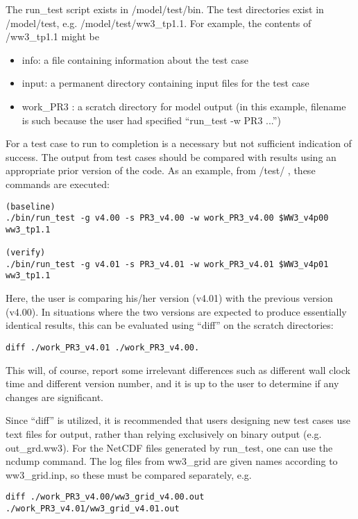 \documentclass[12pt]{article}
\newcommand{\file}{\sf}
\begin{document}
The {\file run\_test} script exists in {\file /model/test/bin}. The test
directories exist in {\file /model/test}, e.g.  {\file/model/test/ww3\_tp1.1}. For
example, the contents of {\file /ww3\_tp1.1} might be
  \begin{itemize}
\item {\file info}: a file containing information
about the test case 
\item {\file input}: a permanent directory containing input files for
the test case 
\item {\file work\_PR3} : a scratch directory for model output (in this
example, filename is such because the user had specified ``{\file run\_test -w PR3
...''})
  \end{itemize}

For a test case to run to completion is a necessary but not sufficient
indication of success. The output from test cases should be compared with
results using an appropriate prior version of the code. As an example, from
{\file/test/} , these commands are executed:
\begin{center}
{\small \begin{verbatim}
(baseline)
./bin/run_test -g v4.00 -s PR3_v4.00 -w work_PR3_v4.00 $WW3_v4p00 ww3_tp1.1

(verify)
./bin/run_test -g v4.01 -s PR3_v4.01 -w work_PR3_v4.01 $WW3_v4p01 ww3_tp1.1
\end{verbatim}}
\end{center}
\noindent
Here, the user is comparing his/her version (v4.01) with the previous version
(v4.00). In situations where the two versions are expected to produce
essentially identical results, this can be evaluated using ``diff'' on the
scratch directories:
\begin{center}
{\small \begin{verbatim}
diff ./work_PR3_v4.01 ./work_PR3_v4.00.
\end{verbatim}}
\end{center}
\noindent
This will, of course, report some irrelevant differences such as different
wall clock time and different version number, and it is up to the user to
determine if any changes are significant.

Since ``diff'' is utilized, it is recommended that users designing new test
cases use text files for output, rather than relying exclusively on binary
output (e.g. {\file out\_grd.ww3}). For the NetCDF files 
generated by {\file run\_test}, one can use the {\file ncdump} command.
The log files from ww3\_grid are given
names according to {\file ww3\_grid.inp}, so these must be compared separately, e.g.
\begin{center}
{\small \begin{verbatim}
diff ./work_PR3_v4.00/ww3_grid_v4.00.out ./work_PR3_v4.01/ww3_grid_v4.01.out
\end{verbatim}}
\end{center}
\end{document}

